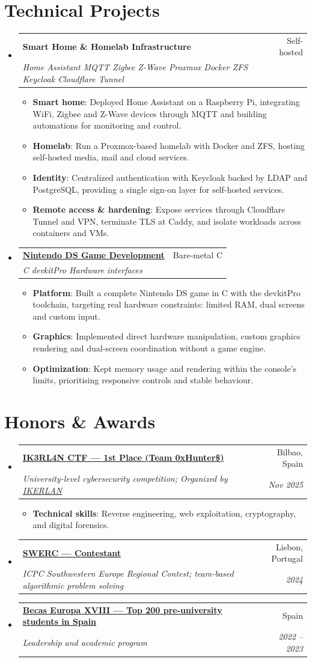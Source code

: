 \documentclass[letterpaper,11pt]{article}
\makeatletter
\newcommand{\resumeItem}[2]{
  \item\small{
    \textbf{#1}{: #2 \vspace{-2pt}}
  }
}
\newcommand{\resumeSubheading}[4]{
  \vspace{-1pt}\item
    \begin{tabular*}{0.97\textwidth}[t]{l@{\extracolsep{\fill}}r}
      \textbf{#1} & #2 \\
      \textit{\small#3} & \textit{\small #4} \\
    \end{tabular*}\vspace{-5pt}
}
\newcommand{\resumeSubHeadingListStart}{\begin{itemize}[leftmargin=*]}
\newcommand{\resumeSubHeadingListEnd}{\end{itemize}}
\newcommand{\resumeItemListStart}{\begin{itemize}}
\newcommand{\resumeItemListEnd}{\end{itemize}\vspace{-5pt}}
\makeatother
\begin{document}
\section{Technical Projects}
  \resumeSubHeadingListStart
    \resumeSubheading
      {Smart Home \& Homelab Infrastructure}{Self-hosted}
      {Home Assistant \textperiodcentered{} MQTT \textperiodcentered{} Zigbee \textperiodcentered{} Z-Wave \textperiodcentered{} Proxmox \textperiodcentered{} Docker \textperiodcentered{} ZFS \textperiodcentered{} Keycloak \textperiodcentered{} Cloudflare Tunnel}{}
      \resumeItemListStart
        \resumeItem{Smart home}
          {Deployed Home Assistant on a Raspberry Pi, integrating WiFi, Zigbee and Z-Wave devices through MQTT and building automations for monitoring and control.}
        \resumeItem{Homelab}
          {Run a Proxmox-based homelab with Docker and ZFS, hosting self-hosted media, mail and cloud services.}
        \resumeItem{Identity}
          {Centralized authentication with Keycloak backed by LDAP and PostgreSQL, providing a single sign-on layer for self-hosted services.}
        \resumeItem{Remote access \& hardening}
          {Expose services through Cloudflare Tunnel and VPN, terminate TLS at Caddy, and isolate workloads across containers and VMs.}
      \resumeItemListEnd

    \resumeSubheading
      {\href{https://github.com/KingJorjai/NDS-IO-Project}{Nintendo DS Game Development}}{Bare-metal C}
      {C \textperiodcentered{} devkitPro \textperiodcentered{} Hardware interfaces}{}
      \resumeItemListStart
        \resumeItem{Platform}
          {Built a complete Nintendo DS game in C with the devkitPro toolchain, targeting real hardware constraints: limited RAM, dual screens and custom input.}
        \resumeItem{Graphics}
          {Implemented direct hardware manipulation, custom graphics rendering and dual-screen coordination without a game engine.}
        \resumeItem{Optimization}
          {Kept memory usage and rendering within the console's limits, prioritising responsive controls and stable behaviour.}
      \resumeItemListEnd
  \resumeSubHeadingListEnd


\section{Honors \& Awards}
  \resumeSubHeadingListStart
    \resumeSubheading{\href{https://www.ikerlan.es/actualidad/ikerlan-lanza-primer-reto-universitario-ciberseguridad-euskadi}{IK3RL4N CTF --- 1st Place (Team 0xHunter\$)}}{Bilbao, Spain}{University-level cybersecurity competition; Organized by \href{https://www.ikerlan.es}{IKERLAN}}{Nov 2025}
      \resumeItemListStart
        \resumeItem{Technical skills}{Reverse engineering, web exploitation, cryptography, and digital forensics.}
      \resumeItemListEnd
    \resumeSubheading{\href{https://swerc.eu/}{SWERC --- Contestant}}{Lisbon, Portugal}{ICPC Southwestern Europe Regional Contest; team-based algorithmic problem solving}{2024}
    \resumeSubheading{\href{https://becaseuropa.es/}{Becas Europa XVIII --- Top 200 pre-university students in Spain}}{Spain}{Leadership and academic program}{2022 -- 2023}
  \resumeSubHeadingListEnd
\end{document}
